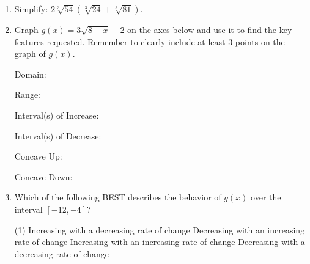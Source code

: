 


\begin{enumerate}[leftmargin=*, label=\textbf{\arabic*.}, resume]

  \item Simplify: $2\sqrt[3]{54}(\sqrt[3]{24}+\sqrt[3]{81})$. 
  \vgappp

  \item Graph $g(x)=3\sqrt{8-x}-2$ on the axes below and use it to find the key features requested. Remember to clearly include at least 3 points on the graph of $g(x)$. 

  \begin{center}
  \end{center}

  Domain: \blank[4em]

  Range: \blank[4em]

  Interval(s) of Increase: \blank[4em]

  Interval(s) of Decrease: \blank[4em]

  Concave Up: \blank[4em]

  Concave Down: \blank[4em]
  \vgapp


  \newpage
  \item Which of the following BEST describes the behavior of $g(x)$ over the interval $[-12,-4]$? 

  \begin{tasks}(1)
    \task Increasing with a decreasing rate of change
    \task Decreasing with an increasing rate of change
    \task Increasing with an increasing rate of change
    \task Decreasing with a decreasing rate of change
  \end{tasks}
  \vgap
  

\end{enumerate}
